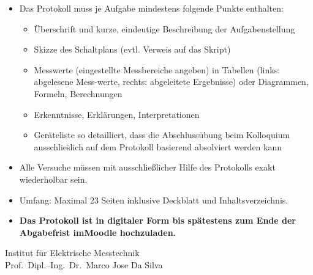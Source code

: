 \documentclass[
parskip,
pagesize=auto,
]{scrbook}
\begin{document}
\vspace{4mm}

{\footnotesize
	\singlespacing
	\begin{itemize}
		\item Das Protokoll muss je Aufgabe mindestens folgende Punkte enthalten:
		      \begin{itemize}
			      \item \"Uberschrift und kurze, eindeutige Beschreibung der Aufgabenstellung
			      \item Skizze des Schaltplans (evtl. Verweis auf das Skript)
			      \item Messwerte (eingestellte Messbereiche angeben) in Tabellen (links: abgelesene Mess-\newline werte, rechts: abgeleitete Ergebnisse) oder Diagrammen, Formeln, Berechnungen
			      \item Erkenntnisse, Erkl\"arungen, Interpretationen
			      \item Ger\"ateliste so detailliert, dass die Abschluss\"ubung beim Kolloquium ausschlie\"slich \newline auf dem Protokoll basierend absolviert werden kann
		      \end{itemize}
		\item Alle Versuche m\"ussen mit ausschlie{\ss}licher Hilfe des Protokolls exakt wiederholbar sein.
		\item Umfang: Maximal 23 Seiten inklusive Deckblatt und Inhaltsverzeichnis.
		\item \textbf{Das Protokoll ist in digitaler Form bis sp\"atestens zum Ende der Abgabefrist im\newline  Moodle hochzuladen.}
	\end{itemize}
}

\vspace{10mm}

{\Large Institut f\"ur Elektrische Messtechnik}\\
{Prof.\ Dipl.--Ing.\ Dr.\ Marco Jose Da Silva}\\
\end{document}
